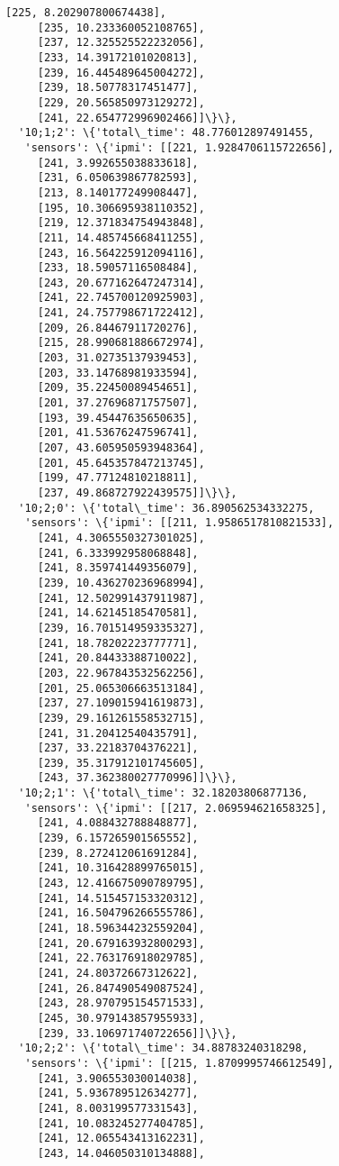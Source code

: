 \documentclass[11pt]{article}
\begin{document}
\begin{tcolorbox}[breakable, size=fbox, boxrule=.5pt, pad at break*=1mm, opacityfill=0]
\begin{Verbatim}[commandchars=\\\{\}]
     [225, 8.202907800674438],
     [235, 10.233360052108765],
     [237, 12.325525522232056],
     [233, 14.39172101020813],
     [239, 16.445489645004272],
     [239, 18.50778317451477],
     [229, 20.565850973129272],
     [241, 22.654772996902466]]\}\},
  '10;1;2': \{'total\_time': 48.776012897491455,
   'sensors': \{'ipmi': [[221, 1.9284706115722656],
     [241, 3.992655038833618],
     [231, 6.050639867782593],
     [213, 8.140177249908447],
     [195, 10.306695938110352],
     [219, 12.371834754943848],
     [211, 14.485745668411255],
     [243, 16.564225912094116],
     [233, 18.59057116508484],
     [243, 20.677162647247314],
     [241, 22.745700120925903],
     [241, 24.757798671722412],
     [209, 26.84467911720276],
     [215, 28.990681886672974],
     [203, 31.02735137939453],
     [203, 33.14768981933594],
     [209, 35.22450089454651],
     [201, 37.27696871757507],
     [193, 39.45447635650635],
     [201, 41.53676247596741],
     [207, 43.605950593948364],
     [201, 45.645357847213745],
     [199, 47.77124810218811],
     [237, 49.868727922439575]]\}\},
  '10;2;0': \{'total\_time': 36.890562534332275,
   'sensors': \{'ipmi': [[211, 1.9586517810821533],
     [241, 4.3065550327301025],
     [241, 6.333992958068848],
     [241, 8.359741449356079],
     [239, 10.436270236968994],
     [241, 12.502991437911987],
     [241, 14.62145185470581],
     [239, 16.701514959335327],
     [241, 18.78202223777771],
     [241, 20.84433388710022],
     [203, 22.967843532562256],
     [201, 25.065306663513184],
     [237, 27.109015941619873],
     [239, 29.161261558532715],
     [241, 31.20412540435791],
     [237, 33.22183704376221],
     [239, 35.317912101745605],
     [243, 37.362380027770996]]\}\},
  '10;2;1': \{'total\_time': 32.18203806877136,
   'sensors': \{'ipmi': [[217, 2.069594621658325],
     [241, 4.088432788848877],
     [239, 6.157265901565552],
     [239, 8.272412061691284],
     [241, 10.316428899765015],
     [243, 12.416675090789795],
     [241, 14.515457153320312],
     [241, 16.504796266555786],
     [241, 18.596344232559204],
     [241, 20.679163932800293],
     [241, 22.763176918029785],
     [241, 24.80372667312622],
     [241, 26.847490549087524],
     [243, 28.970795154571533],
     [245, 30.979143857955933],
     [239, 33.106971740722656]]\}\},
  '10;2;2': \{'total\_time': 34.88783240318298,
   'sensors': \{'ipmi': [[215, 1.8709995746612549],
     [241, 3.906553030014038],
     [241, 5.936789512634277],
     [241, 8.003199577331543],
     [241, 10.083245277404785],
     [241, 12.065543413162231],
     [243, 14.046050310134888],

\end{Verbatim}
\end{tcolorbox}
\end{document}
